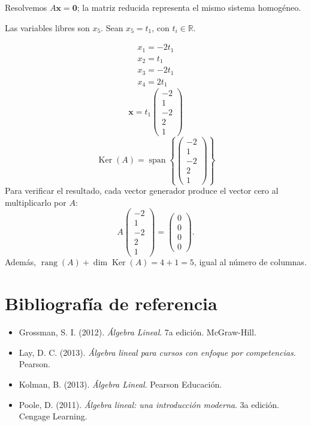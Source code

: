 \documentclass[12pt]{article}
\theoremstyle{remark}
\newcommand{\rang}{\operatorname{rang}}
\newcommand{\Ker}{\operatorname{Ker}}
\newcommand{\vect}[1]{\boldsymbol{#1}}
\begin{document}
Resolvemos $A\vect x=\vect0$; la matriz reducida representa el mismo sistema homogéneo.

Las variables libres son $x_{5}$. Sean $x_{5}=t_{1}$, con $t_i\in\mathbb R$.

\[
\begin{aligned}x_{1}=- 2 t_{1}\\x_{2}=t_{1}\\x_{3}=- 2 t_{1}\\x_{4}=2 t_{1}\end{aligned}
\]
\[
\vect x=t_{1}\begin{pmatrix}-2\\1\\-2\\2\\1\end{pmatrix}
\]
\[
\boxed{\Ker(A)=\operatorname{span}\left\{\begin{pmatrix}-2\\1\\-2\\2\\1\end{pmatrix}\right\}}
\]
Para verificar el resultado, cada vector generador produce el vector cero al multiplicarlo por $A$:
\[
A\begin{pmatrix}-2\\1\\-2\\2\\1\end{pmatrix}=\begin{pmatrix}0\\0\\0\\0\end{pmatrix}.
\]
Además, $\rang(A)+\dim\Ker(A)=4+1=5$, igual al número de columnas.


\medskip


\section*{Bibliografía de referencia}
\begin{itemize}
\item Grossman, S. I. (2012). \emph{Álgebra Lineal}. 7a edición. McGraw-Hill.
\item Lay, D. C. (2013). \emph{Álgebra lineal para cursos con enfoque por competencias}. Pearson.
\item Kolman, B. (2013). \emph{Álgebra Lineal}. Pearson Educación.
\item Poole, D. (2011). \emph{Álgebra lineal: una introducción moderna}. 3a edición. Cengage Learning.
\end{itemize}

\vspace{0.8em}
\end{document}
